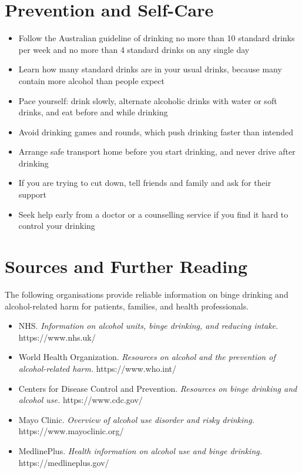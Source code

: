 \section*{Prevention and Self-Care}
\begin{itemize}
    \item Follow the Australian guideline of drinking no more than 10 standard drinks per week and no more than 4 standard drinks on any single day
    \item Learn how many standard drinks are in your usual drinks, because many contain more alcohol than people expect
    \item Pace yourself: drink slowly, alternate alcoholic drinks with water or soft drinks, and eat before and while drinking
    \item Avoid drinking games and rounds, which push drinking faster than intended
    \item Arrange safe transport home before you start drinking, and never drive after drinking
    \item If you are trying to cut down, tell friends and family and ask for their support
    \item Seek help early from a doctor or a counselling service if you find it hard to control your drinking
\end{itemize}

\section*{Sources and Further Reading}
The following organisations provide reliable information on binge drinking and alcohol-related harm for patients, families, and health professionals.

\begin{itemize}
    \item NHS. \textit{Information on alcohol units, binge drinking, and reducing intake.} https://www.nhs.uk/
    \item World Health Organization. \textit{Resources on alcohol and the prevention of alcohol-related harm.} https://www.who.int/
    \item Centers for Disease Control and Prevention. \textit{Resources on binge drinking and alcohol use.} https://www.cdc.gov/
    \item Mayo Clinic. \textit{Overview of alcohol use disorder and risky drinking.} https://www.mayoclinic.org/
    \item MedlinePlus. \textit{Health information on alcohol use and binge drinking.} https://medlineplus.gov/
\end{itemize}
